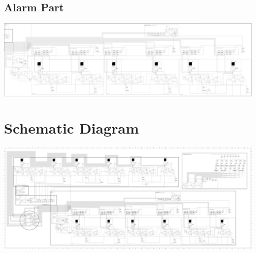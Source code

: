 \documentclass[12pt]{article}
\begin{document}
\subsection{Alarm Part}
\includegraphics[scale=0.55]{Alarm.png}

\clearpage

\section{Schematic Diagram}
\includegraphics[scale=0.18]{Simulation.png}
\end{document}
